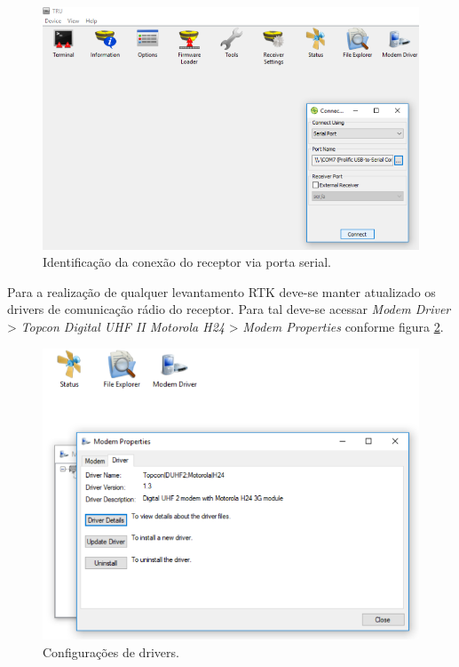 \begin{figure}[H]
\centering
\includegraphics[scale=0.4]{pfc_pdf_files/img/TRU_3_conexao.png}
\caption{Identificação da conexão do receptor via porta serial.}
\label{Rotulo}
\end{figure}

Para a realização de qualquer levantamento RTK deve-se manter atualizado os drivers de comunicação rádio do receptor. Para tal deve-se acessar \textit{Modem Driver} > \textit{Topcon Digital UHF II Motorola H24} > \textit{Modem Properties} conforme figura \ref{conf_modem_tru}.

\begin{figure}[H]
\centering
\includegraphics[scale=0.4]{pfc_pdf_files/img/TRU_5_modem.png}
\caption{Configurações de drivers.}
\label{conf_modem_tru}
\end{figure}

